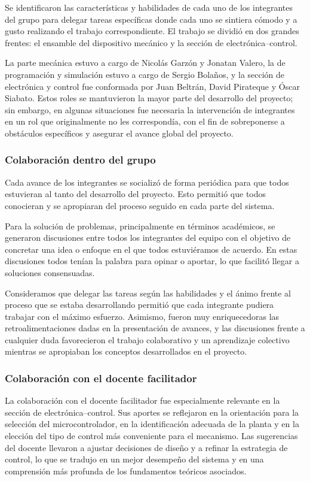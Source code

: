 \documentclass[11pt,a4paper]{article}
\begin{document}
Se identificaron las características y habilidades de cada uno de los integrantes del grupo para delegar
tareas específicas donde cada uno se sintiera cómodo y a gusto realizando el trabajo correspondiente.
El trabajo se dividió en dos grandes frentes: el ensamble del dispositivo mecánico y la sección de
electrónica–control.

La parte mecánica estuvo a cargo de Nicolás Garzón y Jonatan Valero, la de programación y simulación estuvo a cargo de Sergio Bolaños, y la sección de
electrónica y control fue conformada por Juan Beltrán, David Pirateque y Óscar Siabato.
Estos roles se mantuvieron la mayor parte del desarrollo del proyecto; sin embargo, en algunas
situaciones fue necesaria la intervención de integrantes en un rol que originalmente no les correspondía,
con el fin de sobreponerse a obstáculos específicos y asegurar el avance global del proyecto.

\subsubsection*{Colaboración dentro del grupo}

Cada avance de los integrantes se socializó de forma periódica para que todos estuvieran al tanto del
desarrollo del proyecto. Esto permitió que todos conocieran y se apropiaran del proceso seguido en cada
parte del sistema.

Para la solución de problemas, principalmente en términos académicos, se generaron discusiones entre
todos los integrantes del equipo con el objetivo de concretar una idea o enfoque en el que todos
estuviéramos de acuerdo. En estas discusiones todos tenían la palabra para opinar o aportar, lo que
facilitó llegar a soluciones consensuadas.

Consideramos que delegar las tareas según las habilidades y el ánimo frente al proceso que se estaba
desarrollando permitió que cada integrante pudiera trabajar con el máximo esfuerzo. Asimismo, fueron muy
enriquecedoras las retroalimentaciones dadas en la presentación de avances, y las discusiones frente a
cualquier duda favorecieron el trabajo colaborativo y un aprendizaje colectivo mientras se apropiaban los
conceptos desarrollados en el proyecto.

\subsubsection*{Colaboración con el docente facilitador}

La colaboración con el docente facilitador fue especialmente relevante en la sección de electrónica–control. Sus aportes se reflejaron en la orientación para la selección del microcontrolador, en la identificación adecuada de la planta y en la elección del tipo de control más conveniente para el mecanismo. Las sugerencias del docente llevaron a ajustar decisiones de diseño y a refinar la estrategia de control, lo que se tradujo en un mejor desempeño del sistema y en una comprensión más profunda de los fundamentos teóricos asociados.
\end{document}
